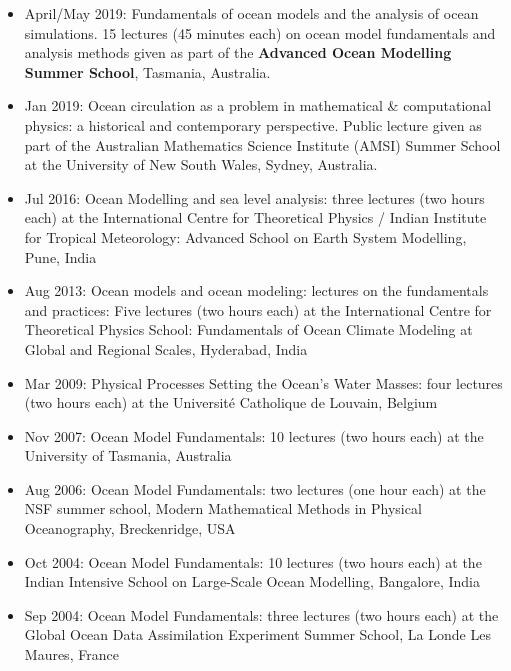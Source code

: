 \documentclass{article}
\begin{document}
\begin{itemize}[leftmargin=*]

\item April/May 2019: {\sc Fundamentals of ocean models and the analysis of ocean simulations}. 15 lectures (45 minutes each) on ocean model fundamentals and analysis methods given as part of the {\bf Advanced Ocean Modelling Summer School}, Tasmania, Australia. 

\item Jan 2019: {\sc Ocean circulation
as a problem in mathematical \& computational physics:  a historical and contemporary  perspective}. Public lecture given as part of the Australian Mathematics Science Institute (AMSI) Summer School at the University of New South Wales, Sydney, Australia. 

\item Jul 2016: {\sc Ocean Modelling and sea level analysis}: three lectures (two hours each) at the International Centre for Theoretical Physics / Indian Institute for Tropical Meteorology: {\sc Advanced School on Earth System Modelling}, Pune, India

\item Aug 2013: {\sc Ocean models and ocean modeling: lectures on the fundamentals and practices}: Five lectures (two hours each) at the International Centre for Theoretical Physics School: {\sc Fundamentals of Ocean Climate Modeling at Global and Regional Scales}, Hyderabad, India

\item Mar 2009: {\sc Physical Processes Setting the Ocean's Water Masses}: four lectures (two hours each) at the Universit\'e Catholique de Louvain, Belgium

\item Nov 2007: {\sc Ocean Model Fundamentals}: 10 lectures (two hours each) at the University of Tasmania, Australia 

\item Aug 2006: {\sc Ocean Model Fundamentals}: two lectures (one hour each) at the NSF summer school, {\sc Modern Mathematical Methods in
Physical Oceanography}, Breckenridge, USA

\item Oct 2004: {\sc Ocean Model Fundamentals}: 10 lectures (two hours each) at the {\sc Indian Intensive School on Large-Scale Ocean Modelling}, Bangalore, India

\item Sep 2004: {\sc Ocean Model Fundamentals}: three lectures (two hours each) at the {\sc Global Ocean Data Assimilation Experiment  Summer School}, La Londe Les Maures, France


\end{itemize}
\end{document}
